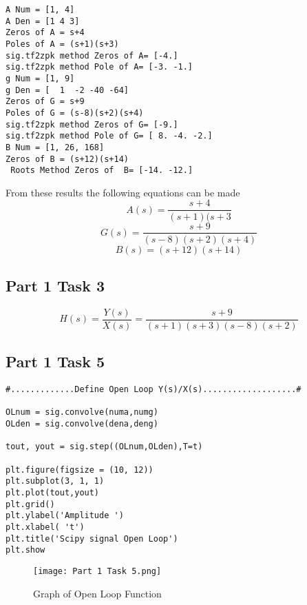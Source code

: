 \documentclass[11pt,a4]{report}
\begin{document}
\begin{lstlisting}
A Num = [1, 4]
A Den = [1 4 3]
Zeros of A = s+4
Poles of A = (s+1)(s+3)
sig.tf2zpk method Zeros of A= [-4.]
sig.tf2zpk method Pole of A= [-3. -1.]
g Num = [1, 9]
g Den = [  1  -2 -40 -64]
Zeros of G = s+9
Poles of G = (s-8)(s+2)(s+4)
sig.tf2zpk method Zeros of G= [-9.]
sig.tf2zpk method Pole of G= [ 8. -4. -2.]
B Num = [1, 26, 168]
Zeros of B = (s+12)(s+14)
 Roots Method Zeros of  B= [-14. -12.]
\end{lstlisting}
From these results the following equations can be made
\begin{equation}
    A(s) = \frac{s+4}{(s+1)(s+3}
\end{equation}
\begin{equation}
    G(s) = \frac{s+9}{(s-8)(s+2)(s+4)}
\end{equation}
\begin{equation}
    B(s) = (s+12)(s+14)
\end{equation}


\subsection{Part 1 Task 3}

\begin{equation}
    H(s) = \frac{Y(s)}{X(s)} = \frac{s+9}{(s+1)(s+3)(s-8)(s+2)}
\end{equation}

\subsection{Part 1 Task 5}
\begin{lstlisting}
#.............Define Open Loop Y(s)/X(s)...................#

OLnum = sig.convolve(numa,numg)
OLden = sig.convolve(dena,deng)

tout, yout = sig.step((OLnum,OLden),T=t)

plt.figure(figsize = (10, 12))
plt.subplot(3, 1, 1)
plt.plot(tout,yout)
plt.grid()
plt.ylabel('Amplitude ')
plt.xlabel( 't')
plt.title('Scipy signal Open Loop')
plt.show

\end{lstlisting}

\begin{figure}[h!]
    \begin{center}
  \caption{Graph of Open Loop Function}
  \texttt{[image: Part 1 Task 5.png]}
\end{center}
\end{figure}
\newpage
\end{document}
